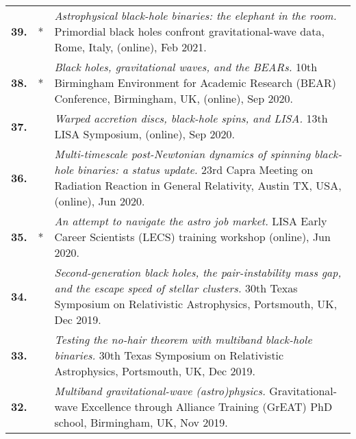 {\begin{longtable}{rp{0.3cm}p{15.8cm}}
%
\textbf{39.} & * & \textit{Astrophysical black-hole binaries: the elephant in the room.}
\newline{}
Primordial black holes confront gravitational-wave data, Rome, Italy, (online), Feb 2021.
\vspace{0.05cm}\\
%
\textbf{38.} & * & \textit{Black holes, gravitational waves, and the BEARs.}
\newline{}
10th Birmingham Environment for Academic Research (BEAR) Conference, Birmingham, UK, (online), Sep 2020.
\vspace{0.05cm}\\
%
\textbf{37.} &  & \textit{Warped accretion discs, black-hole spins, and LISA.}
\newline{}
13th LISA Symposium, (online), Sep 2020.
\vspace{0.05cm}\\
%
\textbf{36.} &  & \textit{Multi-timescale post-Newtonian dynamics of spinning black-hole binaries: a status update.}
\newline{}
23rd Capra Meeting on Radiation Reaction in General Relativity, Austin TX, USA, (online), Jun 2020.
\vspace{0.05cm}\\
%
\textbf{35.} & * & \textit{An attempt to navigate the astro job market.}
\newline{}
LISA Early Career Scientists (LECS) training workshop (online), Jun 2020.
\vspace{0.05cm}\\
%
\textbf{34.} &  & \textit{Second-generation black holes, the pair-instability mass gap, and the escape speed of stellar clusters.}
\newline{}
30th Texas Symposium on Relativistic Astrophysics, Portsmouth, UK, Dec 2019.
\vspace{0.05cm}\\
%
\textbf{33.} &  & \textit{Testing the no-hair theorem with multiband black-hole binaries.}
\newline{}
30th Texas Symposium on Relativistic Astrophysics, Portsmouth, UK, Dec 2019.
\vspace{0.05cm}\\
%
\textbf{32.} &  & \textit{Multiband gravitational-wave (astro)physics.}
\newline{}
Gravitational-wave Excellence through Alliance Training (GrEAT) PhD school, Birmingham, UK, Nov 2019.
\vspace{0.05cm}\\

\end{longtable}}
